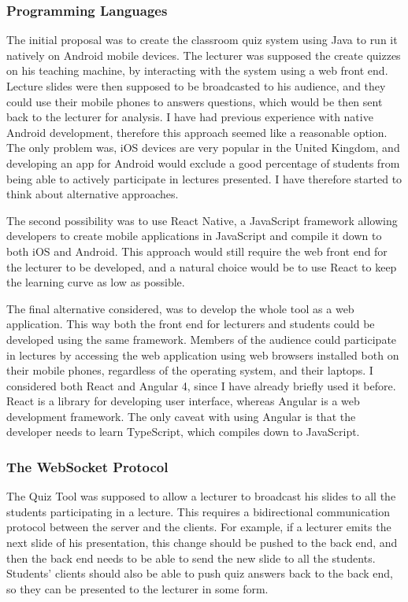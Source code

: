 \subsubsection{Programming Languages}
The initial proposal was to create the classroom quiz system using Java\cite{3} to run it natively
on Android\cite{4} mobile devices. The lecturer was supposed the create quizzes on his teaching
machine, by interacting with the system using a web front end. Lecture slides were then supposed
to be broadcasted to his audience, and they could use their mobile phones to answers questions,
which would be then sent back to the lecturer for analysis. I have had previous experience with
native Android development, therefore this approach seemed like a reasonable option. The only problem was,
iOS\cite{5} devices are very popular in the United Kingdom, and developing an app for Android would exclude
a good percentage of students from being able to actively participate in lectures presented. I have
therefore started to think about alternative approaches.

The second possibility was to use React Native\cite{6}, a JavaScript\cite{7} framework allowing
developers to create mobile applications in JavaScript and compile it down to both iOS and Android.
This approach would still require the web front end for the lecturer to be developed, and a natural
choice would be to use React\cite{8} to keep the learning curve as low as possible.

The final alternative considered, was to develop the whole tool as a web application. This way both the
front end for lecturers and students could be developed using the same framework. Members of the audience
could participate in lectures by accessing the web application using web browsers installed
both on their mobile phones, regardless of the operating system, and their laptops. I considered
both React and Angular 4\cite{9}, since I have already briefly used it before. React is a library
for developing user interface, whereas Angular is a web development framework. The only caveat with
using Angular is that the developer needs to learn TypeScript\cite{10}, which compiles down to JavaScript.

\subsubsection{The WebSocket Protocol}
The Quiz Tool was supposed to allow a lecturer to broadcast his slides to all the students
participating in a lecture. This requires a bidirectional communication protocol between the
server and the clients. For example, if a lecturer emits the next slide of his presentation,
this change should be pushed to the back end, and then the back end needs to be able to
send the new slide to all the students. Students' clients should also be able to push quiz
answers back to the back end, so they can be presented to the lecturer in some form.

